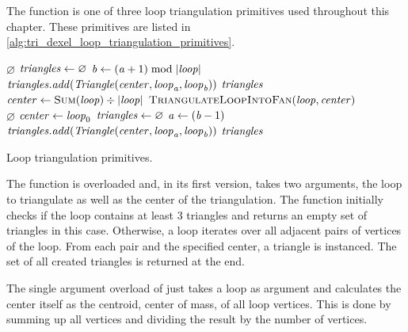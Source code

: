 The  function is one of three loop triangulation primitives used throughout this chapter.
These primitives are listed in \cref{alg:tri_dexel_loop_triangulation_primitives}.
%
\begin{algorithm}
	\centering
	\begin{algorithmic}[1]
				\State \Return $\varnothing$
			\EndIf
			\State $\mathit{triangles} \gets \varnothing$
				\State $\mathit{b} \gets (\mathit{a} + 1) \bmod |\mathit{loop}|$
				\State $\mathit{triangles}.\mathit{add}(\mathit{Triangle}(\mathit{center}, \mathit{loop}_{\mathit{a}}, \mathit{loop}_{\mathit{b}}))$
			\EndFor
			\State \Return $\mathit{triangles}$
		\EndFunction
		\\
			\State $\var{center} \gets \Call{Sum}{\var{loop}} \div |\var{loop}|$
			\State \Return $\Call{TriangulateLoopIntoFan}{\var{loop}, \var{center}}$
		\EndFunction
		\\
				\State \Return $\varnothing$
			\EndIf
			\State $\mathit{center} \gets \mathit{loop}_0$
			\State $\mathit{triangles} \gets \varnothing$
				\State $\mathit{a} \gets (\mathit{b} - 1)$
				\State $\mathit{triangles}.\mathit{add}(\mathit{Triangle}(\mathit{center}, \mathit{loop}_{\mathit{a}}, \mathit{loop}_{\mathit{b}}))$
			\EndFor
			\State \Return $\mathit{triangles}$
		\EndFunction
	\end{algorithmic}
	\caption{
		Loop triangulation primitives.
	}
	\label{alg:tri_dexel_loop_triangulation_primitives}
\end{algorithm}
%
The  function is overloaded and, in its first version, takes two arguments, the loop to triangulate as well as the center of the triangulation.
The function initially checks if the loop contains at least 3 triangles and returns an empty set of triangles in this case.
Otherwise, a loop iterates over all adjacent pairs of vertices of the loop.
From each pair and the specified center, a triangle is instanced.
The set of all created triangles is returned at the end.

The single argument overload of  just takes a loop as argument and calculates the center itself as the centroid, \ie center of mass, of all loop vertices.
This is done by summing up all vertices and dividing the result by the number of vertices.

